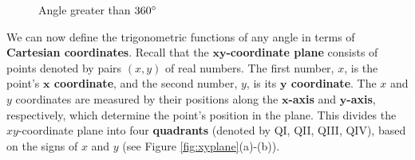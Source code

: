 \begin{figure}[h]
 \begin{center}
  \vspace{-2mm}
 \end{center}
 \caption[]{\quad Angle greater than $360^\circ$}
 \label{fig:plus360}
\end{figure}

We can now define the trigonometric functions of any angle in terms of
\textbf{Cartesian coordinates}. Recall that the
$\bm{xy}$\textbf{-coordinate plane} consists of points denoted
by pairs $(x,y)$ of real numbers. The first number, $x$, is the
point's \textbf{$\bm{x}$ coordinate}, and the second number, $y$, is its
\textbf{$\bm{y}$ coordinate}. The $x$ and $y$ coordinates are measured by their
positions along the \textbf{$\bm{x}$-axis} and \textbf{$\bm{y}$-axis}, respectively, which determine
the point's position in the plane.
This divides the $xy$-coordinate plane into four
\textbf{quadrants} (denoted by QI, QII, QIII, QIV), based on the signs of
$x$ and $y$ (see Figure \ref{fig:xyplane}(a)-(b)).\vspace{-1mm}


